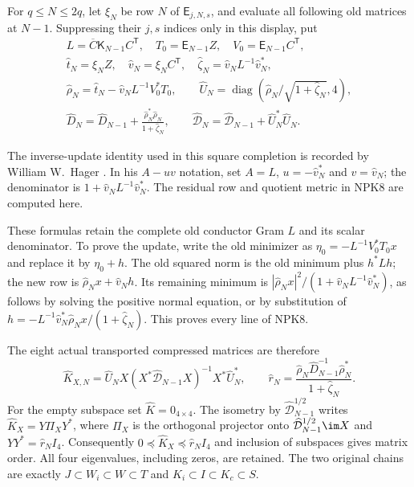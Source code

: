 \documentclass[11pt,a4paper]{article}
\begin{document}
For $q\le N\le2q$, let $\xi_N$ be row $N$ of
$\mathsf E_{j,N,s}$, and evaluate all following old matrices at
$N-1$. Suppressing their $j,s$ indices only in this display, put
\[
 \begin{gathered}
 L=\overline C\mathsf K_{N-1}C^{\mathsf T},\quad
 T_0=\mathsf E_{N-1}Z,\quad V_0=\mathsf E_{N-1}C^{\mathsf T},\\
 \widehat t_N=\xi_NZ,\quad \widehat v_N=\xi_NC^{\mathsf T},\quad
 \widehat\zeta_N=\widehat v_NL^{-1}\widehat v_N^*,\\
 \widehat\rho_N=\widehat t_N-
       \widehat v_NL^{-1}V_0^*T_0,\qquad
 \widehat U_N=\operatorname{diag}
       (\widehat\rho_N/\sqrt{1+\widehat\zeta_N},4),\\
 \widehat D_N=\widehat D_{N-1}
       +\frac{\widehat\rho_N^*\widehat\rho_N}{1+\widehat\zeta_N},\qquad
 \widehat{\mathcal D}_N=\widehat{\mathcal D}_{N-1}+\widehat U_N^*\widehat U_N.
 \end{gathered}\tag{NPK8}
\]


The inverse-update identity used in this square completion is recorded
by William W.~Hager \cite[p.~221, (2)]{human:hager1989}.
In his $A-uv$ notation, set $A=L$, $u=-\widehat v_N^*$ and
$v=\widehat v_N$; the denominator is
$1+\widehat v_NL^{-1}\widehat v_N^*$.
The residual row and quotient metric in NPK8 are computed here.

These formulas retain the complete old conductor Gram $L$ and
its scalar denominator. To prove the update, write the old
minimizer as $\eta_0=-L^{-1}V_0^*T_0x$ and replace it by
$\eta_0+h$. The old squared norm is the old minimum plus
$h^*Lh$; the new row is $\widehat\rho_Nx+\widehat v_Nh$.
Its remaining minimum is
$|\widehat\rho_Nx|^2/(1+\widehat v_NL^{-1}\widehat v_N^*)$,
as follows by solving the positive normal equation, or by
substitution of
$h=-L^{-1}\widehat v_N^*\widehat\rho_Nx/(1+\widehat\zeta_N)$.
This proves every line of NPK8.

The eight actual transported compressed matrices are therefore
\[
 \widehat K_{X,N}=\widehat U_NX
 (X^*\widehat{\mathcal D}_{N-1}X)^{-1}X^*\widehat U_N^*,\qquad
 \widehat r_N=
 \frac{\widehat\rho_N\widehat D_{N-1}^{-1}\widehat\rho_N^*}
 {1+\widehat\zeta_N} .\tag{NPK9}
\]
For the empty subspace set $\widehat K=0_{4\times4}$.
The isometry by $\widehat{\mathcal D}_{N-1}^{1/2}$ writes
$\widehat K_X=Y\Pi_XY^*$, where $\Pi_X$ is the orthogonal
projector onto $\widehat{\mathcal D}_{N-1}^{1/2}\im X$ and
$YY^*=\widehat r_N I_4$. Consequently
$0\preceq\widehat K_X\preceq\widehat r_N I_4$ and inclusion
of subspaces gives matrix order. All four eigenvalues, including
zeros, are retained. The two original chains are exactly
$J\subset W_i\subset W\subset T$ and
$K_i\subset I\subset K_c\subset S$.
\end{document}
